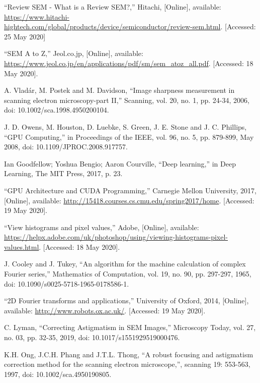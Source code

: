 \documentclass[12pt, twocolumn]{report}
\begin{document}
\begin{thebibliography}{00}
    ``Review SEM - What is a Review SEM?,'' Hitachi, [Online], available: \url{https://www.hitachi-hightech.com/global/products/device/semiconductor/review-sem.html}. [Accessed: 25 May 2020]

    ``SEM A to Z,'' Jeol.co.jp, [Online], available: \url{https://www.jeol.co.jp/en/applications/pdf/sm/sem_atoz_all.pdf}. [Accessed: 18 May 2020].

    A. Vladár, M. Postek and M. Davidson, ``Image sharpness measurement in scanning electron microscopy-part II,'' Scanning, vol. 20, no. 1, pp. 24-34, 2006, doi: 10.1002/sca.1998.4950200104.

    J. D. Owens, M. Houston, D. Luebke, S. Green, J. E. Stone and J. C. Phillips, ``GPU Computing,'' in Proceedings of the IEEE, vol. 96, no. 5, pp. 879-899, May 2008, doi: 10.1109/JPROC.2008.917757.

    Ian Goodfellow; Yoshua Bengio; Aaron Courville, ``Deep learning,'' in Deep Learning, The MIT Press, 2017, p. 23.

    ``GPU Architecture and CUDA Programming,'' Carnegie Mellon University, 2017, [Online], available: \url{http://15418.courses.cs.cmu.edu/spring2017/home}. [Accessed: 19 May 2020].

    ``View histograms and pixel values,'' Adobe, [Online], available: \url{https://helpx.adobe.com/uk/photoshop/using/viewing-histograms-pixel-values.html}. [Accessed: 18 May 2020].

    J. Cooley and J. Tukey, ``An algorithm for the machine calculation of complex Fourier series,'' Mathematics of Computation, vol. 19, no. 90, pp. 297-297, 1965, doi: 10.1090/s0025-5718-1965-0178586-1.

    ``2D Fourier transforms and applications,'' University of Oxford, 2014, [Online], available: \url{http://www.robots.ox.ac.uk/}. [Accessed: 19 May 2020].

    C. Lyman, ``Correcting Astigmatism in SEM Images,'' Microscopy Today, vol. 27, no. 03, pp. 32-35, 2019, doi: 10.1017/s1551929519000476.

    K.H. Ong, J.C.H. Phang and J.T.L. Thong, ``A robust focusing and astigmatism correction method for the scanning electron microscope,'', scanning 19: 553-563, 1997, doi: 10.1002/sca.4950190805.
\end{thebibliography}
\end{document}

